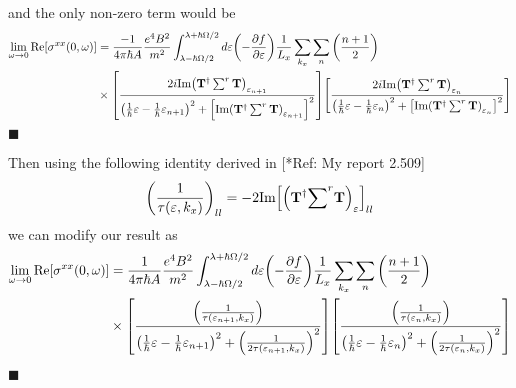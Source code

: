 and the only non-zero term would be
\begin{equation} \label{7.8}
  \begin{aligned}
    \lim_{\omega \to 0}
    \text{Re}[{\sigma}^{xx}(0,\omega)] & =
    \frac{-1}{4\pi\hbar A}
    \frac{e^4B^2}{{m^2}}
    \int_{\lambda-\hbar\Omega/2}^{\lambda+ \hbar\Omega/2} d\varepsilon
    \qty(
    -\frac{\partial f}{\partial \varepsilon})
    \frac{1}{L_x} \sum_{k_x} \sum_{n}
    \qty(\frac{n+1}{2})
    \\
    & \times
    \qty[
    \frac{2i \text{Im}\qty(\mathbf{T}^{\dagger} \sum^r \mathbf{T})_{\varepsilon_{n+1}}
    }
    {
    \qty(
    \frac{1}{\hbar}\varepsilon -
    \frac{1}{\hbar}\varepsilon_{n+1}
    )^2
    + \qty[\text{Im}\qty(\mathbf{T}^{\dagger} \sum^r \mathbf{T})_{\varepsilon_{n+1}}]^2
    }]
    \qty[
    \frac{2i \text{Im}\qty(\mathbf{T}^{\dagger} \sum^r \mathbf{T})_{\varepsilon_{n}}
    }
    {
    \qty(
    \frac{1}{\hbar}\varepsilon -
    \frac{1}{\hbar}\varepsilon_{n}
    )^2
    + \qty[\text{Im}\qty(\mathbf{T}^{\dagger} \sum^r \mathbf{T})_{\varepsilon_{n}}]^2
    }]
  \end{aligned}
\end{equation}
\hfill$\blacksquare$

\noindent
Then using the following identity derived in [*Ref: My report 2.509]
\begin{equation} \label{7.9}
  \qty(\frac{1}{\tau(\varepsilon,k_x)})_{ll} =
  -2\text{Im}\qty[\qty(\mathbf{T}^{\dagger} {\sum}^r \mathbf{T})_{\varepsilon}]_{ll}
\end{equation}
we can modify our result as
\begin{equation} \label{7.10}
  \begin{aligned}
    \lim_{\omega \to 0}
    \text{Re}[{\sigma}^{xx}(0,\omega)] & =
    \frac{1}{4\pi\hbar A}
    \frac{e^4B^2}{{m^2}}
    \int_{\lambda-\hbar\Omega/2}^{\lambda+ \hbar\Omega/2} d\varepsilon
    \qty(
    -\frac{\partial f}{\partial \varepsilon})
    \frac{1}{L_x} \sum_{k_x} \sum_{n}
    \qty(\frac{n+1}{2})
    \\
    & \times
    \qty[
    \frac{\qty(\frac{1}{\tau(\varepsilon_{n+1},k_x)})
    }
    {
    \qty(
    \frac{1}{\hbar}\varepsilon -
    \frac{1}{\hbar}\varepsilon_{n+1}
    )^2
    + \qty(\frac{1}{2\tau(\varepsilon_{n+1},k_x)})^2
    }]
    \qty[
    \frac{\qty(\frac{1}{\tau(\varepsilon_{n},k_x)})
    }
    {
    \qty(
    \frac{1}{\hbar}\varepsilon -
    \frac{1}{\hbar}\varepsilon_{n}
    )^2
    + \qty(\frac{1}{2\tau(\varepsilon_{n},k_x)})^2
    }]
  \end{aligned}
\end{equation}


























\hfill$\blacksquare$
